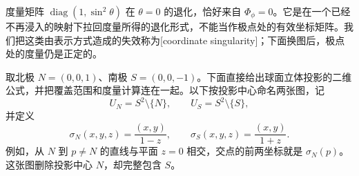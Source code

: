 度量矩阵 \(\operatorname{diag}(1,\sin^2\theta)\) 在 \(\theta=0\) 的退化，恰好来自 \(\Phi_\phi=0\)。它是在一个已经不再浸入的映射下拉回度量所得的退化形式，不能当作极点处的有效坐标矩阵。我们把这类由表示方式造成的失效称为[coordinate singularity]；下面换图后，极点处的度量仍是正定的。

\ProseParagraphBreak

取北极 \(N=(0,0,1)\)、南极 \(S=(0,0,-1)\)。下面直接给出球面立体投影的二维公式，并把覆盖范围和度量计算连在一起。以下按投影中心命名两张图，记
\[
	U_N=S^2\setminus\{N\},\qquad U_S=S^2\setminus\{S\},
\]
并定义
\[
	\sigma_N(x,y,z)=\frac{(x,y)}{1-z},\qquad
	\sigma_S(x,y,z)=\frac{(x,y)}{1+z}.
\]
例如，从 \(N\) 到 \(p\ne N\) 的直线与平面 \(z=0\) 相交，交点的前两坐标就是 \(\sigma_N(p)\)。这张图删除投影中心 \(N\)，却完整包含 \(S\)。

